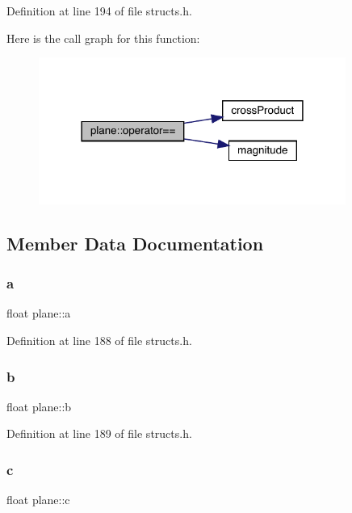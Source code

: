 Definition at line 194 of file structs.\+h.

Here is the call graph for this function\+:
\nopagebreak
\begin{figure}[H]
\begin{center}
\leavevmode
\includegraphics[width=285pt]{structplane_a7362172307c64ca0ba40633337f318ca_cgraph}
\end{center}
\end{figure}


\subsection{Member Data Documentation}
\mbox{\label{structplane_a93c319b577955eca012b2866db926c1f}} 
\subsubsection{\texorpdfstring{a}{a}}
{\footnotesize\ttfamily float plane\+::a}



Definition at line 188 of file structs.\+h.

\mbox{\label{structplane_af4a97d4328067448317dd787e048bc70}} 
\subsubsection{\texorpdfstring{b}{b}}
{\footnotesize\ttfamily float plane\+::b}



Definition at line 189 of file structs.\+h.

\mbox{\label{structplane_a3024e149a5b2cb4697fa71ae7d539bd1}} 
\subsubsection{\texorpdfstring{c}{c}}
{\footnotesize\ttfamily float plane\+::c}



